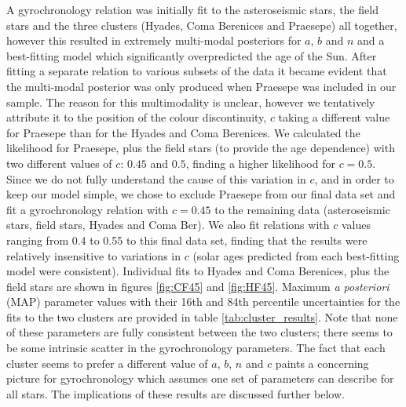 \documentclass[10pt,preprint]{aastex}
\begin{document}
A gyrochronology relation was initially fit to the asteroseismic stars, the field stars and the three clusters (Hyades, Coma Berenices and Praesepe) all together, however this resulted in extremely multi-modal posteriors for $a$, $b$ and $n$ and a best-fitting model which significantly overpredicted the age of the Sun.
After fitting a separate relation to various subsets of the data it became evident that the multi-modal posterior was only produced when Praesepe was included in our sample.
The reason for this multimodality is unclear, however we tentatively attribute it to the position of the colour discontinuity, $c$ taking a different value for Praesepe than for the Hyades and Coma Berenices.
We calculated the likelihood for Praesepe, plus the field stars (to provide the age dependence) with two different values of $c$: $0.45$ and $0.5$, finding a higher likelihood for $c=0.5$.
Since we do not fully understand the cause of this variation in $c$, and in order to keep our model simple, we chose to exclude Praesepe from our final data set and fit a gyrochronology relation with $c=0.45$ to the remaining data (asteroseismic stars, field stars, Hyades and Coma Ber).
We also fit relations with $c$ values ranging from 0.4 to 0.55 to this final data set, finding that the results were relatively insensitive to variations in $c$ (solar ages predicted from each best-fitting model were consistent).
Individual fits to Hyades and Coma Berenices, plus the field stars are shown in figures \ref{fig:CF45} and \ref{fig:HF45}.
Maximum {\it a posteriori} (MAP) parameter values with their 16th and 84th percentile uncertainties for the fits to the two clusters are provided in table \ref{tab:cluster_results}.
Note that none of these parameters are fully consistent between the two clusters; there seems to be some intrinsic scatter in the gyrochronology parameters.
The fact that each cluster seems to prefer a different value of $a$, $b$, $n$ and $c$ paints a concerning picture for gyrochronology which assumes one set of parameters can describe for all stars. The implications of these results are discussed further below.
\end{document}
